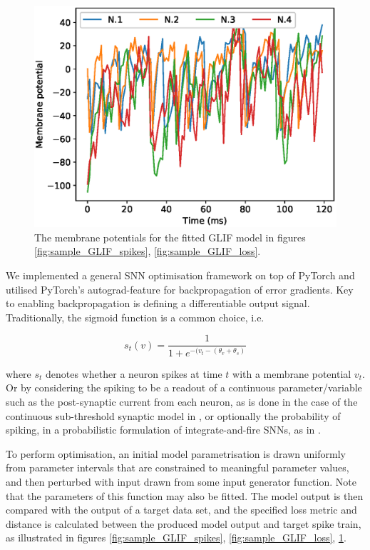 \documentclass[mphil,deptreport,ianc]{infthesis} %
\begin{document}
\begin{figure}
    \centering
    \vskip -0.1in
    \includegraphics[width=0.7\columnwidth]{figures/samples/membrane_potentials/export_sample_GLIF_white_noise.eps}
    \vskip -0.1in
    \caption{The membrane potentials for the fitted GLIF model in figures \ref{fig:sample_GLIF_spikes}, \ref{fig:sample_GLIF_loss}.}
    \label{fig:sample_GLIF_vs}
\end{figure}

We implemented a general SNN optimisation framework on top of PyTorch \cite{Paszke2017, Paszke2019} and utilised PyTorch's autograd-feature for backpropagation of error gradients.
Key to enabling backpropagation is defining a differentiable output signal. Traditionally, the sigmoid function is a common choice, i.e.

\begin{equation}
    s_t(v) = \frac{1}{1+e^{-(v_t-(\theta_v + \theta_s)}}
\end{equation}

where $s_t$ denotes whether a neuron spikes at time $t$ with a membrane potential $v_t$. Or by considering the spiking to be a readout of a continuous parameter/variable such as the post-synaptic current from each neuron, as is done in the case of the continuous sub-threshold synaptic model in \cite{Huh2017}, or optionally the probability of spiking, in a probabilistic formulation of integrate-and-fire SNNs, as in \cite{Rene2020}.

To perform optimisation, an initial model parametrisation is drawn uniformly from parameter intervals that are constrained to meaningful parameter values, and then perturbed with input drawn from some input generator function. Note that the parameters of this function may also be fitted.
The model output is then compared with the output of a target data set, and the specified loss metric and distance is calculated between the produced model output and target spike train, as illustrated in figures \ref{fig:sample_GLIF_spikes}, \ref{fig:sample_GLIF_loss}, \ref{fig:sample_GLIF_vs}.
\end{document}
